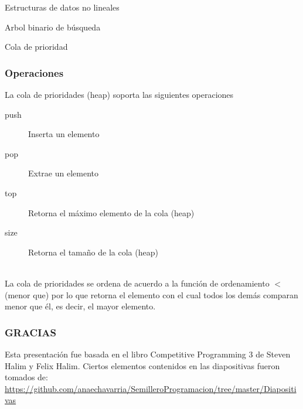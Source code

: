 \documentclass{beamer}
\begin{document}
\begin{section}{Estructuras de datos no lineales}
\begin{subsection}{Arbol binario de búsqueda}
\begin{subsubsection}{Cola de prioridad}
	
	\begin{frame}
		\frametitle{Operaciones}
		La cola de prioridades (heap) soporta las siguientes operaciones
		\begin{description}
			\item [push] Inserta un elemento
			\item [pop] Extrae un elemento
			\item [top] Retorna el máximo elemento de la cola (heap)
			\item [size] Retorna el tamaño de la cola (heap)
		\end{description}
		\quad \\
		La cola de prioridades se ordena de acuerdo a la función de ordenamiento $<$ (menor que) por lo que retorna el elemento con el cual todos los demás comparan menor que él, es decir, el mayor elemento.
	\end{frame}

	\begin{frame}
		\frametitle{GRACIAS}
		Esta presentación fue basada en el libro Competitive Programming 3 de Steven Halim y Felix Halim.
		\newline
		Ciertos elementos contenidos en las diapositivas fueron tomados de:
		\url{https://github.com/anaechavarria/SemilleroProgramacion/tree/master/Diapositivas}
	\end{frame}
\end{subsubsection}
\end{subsection}
\end{section}
\end{document}
